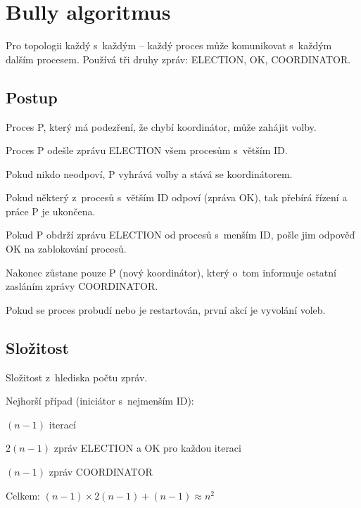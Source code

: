 
\section{Bully algoritmus}

Pro topologii každý s~každým -- každý proces může komunikovat s~každým dalším procesem. Používá tři druhy zpráv: ELECTION, OK, COORDINATOR.

\subsection*{Postup}

\begin{compactitem}
    \item Proces P, který má podezření, že chybí koordinátor, může zahájit volby.
    \begin{compactenum}
        \item Proces P odešle zprávu ELECTION všem procesům s~větším ID.
        \item Pokud nikdo neodpoví, P vyhrává volby a stává se koordinátorem.
        \item Pokud některý z~procesů s~větším ID odpoví (zpráva OK), tak přebírá řízení a práce P je ukončena.
        \item Pokud P obdrží zprávu ELECTION od procesů s~menším ID, pošle jim odpověď OK na zablokování procesů.
    \end{compactenum}
    \item Nakonec zůstane pouze P (nový koordinátor), který o~tom informuje ostatní zasláním zprávy COORDINATOR.
    \item Pokud se proces probudí nebo je restartován, první akcí je vyvolání voleb.
\end{compactitem}

\subsection*{Složitost}

Složitost z~hlediska počtu zpráv.

\bigskip\noindent Nejhorší případ (iniciátor s~nejmenším ID):

\begin{compactitem}
    \item $(n-1)$ iterací
    \item $2(n-1)$ zpráv ELECTION a OK pro každou iteraci
    \item $(n-1)$ zpráv COORDINATOR
    \item Celkem: $(n-1) \times 2(n-1) + (n-1) \approx n^2$
\end{compactitem}

